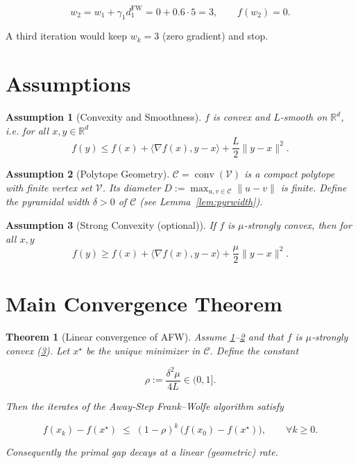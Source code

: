 \documentclass{article}
\newtheorem{theorem}{Theorem}
\newtheorem{assumption}{Assumption}
\newcommand{\conv}{\operatorname{conv}}
\newcommand{\poly}{\mathcal{C}}
\newcommand{\grad}{\nabla}
\newcommand{\R}{\mathbb{R}}
\begin{document}
\[
w_2 = w_1 + \gamma_1 d^{\text{FW}}_1 = 0 + 0.6\cdot5 = 3,
\qquad f(w_2)=0 .
\]

A third iteration would keep $w_k=3$ (zero gradient) and stop.

\section*{Assumptions}
\begin{assumption}[Convexity and Smoothness]\label{as:convex}
$f$ is convex and $L$‑smooth on $\R^{d}$, i.e. for all $x,y\in\R^{d}$
\[
f(y) \le f(x) + \langle \grad f(x),y-x\rangle + \frac{L}{2}\|y-x\|^{2}.
\]
\end{assumption}
\begin{assumption}[Polytope Geometry]\label{as:poly}
$\poly=\conv(\mathcal{V})$ is a compact polytope with finite vertex set
$\mathcal{V}$.  Its \emph{diameter} $D:=\max_{u,v\in\poly}\|u-v\|$ is finite.
Define the \emph{pyramidal width} $\delta>0$ of $\poly$ (see Lemma~\ref{lem:pyrwidth}).
\end{assumption}
\begin{assumption}[Strong Convexity (optional)]\label{as:strong}
If $f$ is $\mu$‑strongly convex, then for all $x,y$
\[
f(y) \ge f(x) + \langle \grad f(x),y-x\rangle + \frac{\mu}{2}\|y-x\|^{2}.
\]
\end{assumption}

\section*{Main Convergence Theorem}
\begin{theorem}[Linear convergence of AFW]\label{thm:linear}
Assume \ref{as:convex}–\ref{as:poly} and that $f$ is $\mu$‑strongly convex
(\ref{as:strong}).  Let $x^\star$ be the unique minimizer in $\poly$.
Define the constant  

\[
\rho := \frac{\delta^{2}\mu}{4L}\in(0,1].
\]

Then the iterates of the Away‑Step Frank–Wolfe algorithm satisfy  

\[
f(x_{k})-f(x^\star) \;\le\; (1-\rho)^{k}\,\bigl(f(x_{0})-f(x^\star)\bigr),
\qquad\forall k\ge 0 .
\]

Consequently the primal gap decays at a linear (geometric) rate.
\end{theorem}
\end{document}
